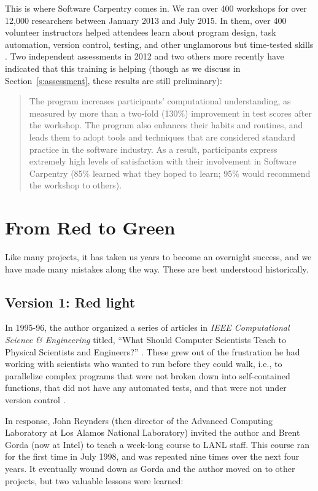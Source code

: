 \documentclass[10pt,a4paper,twocolumn]{article}
\begin{document}
This is where Software Carpentry comes in. We ran over 400 workshops
for over 12,000 researchers between January 2013 and July 2015. In
them, over 400 volunteer instructors helped attendees learn about
program design, task automation, version control, testing, and other
unglamorous but time-tested skills \cite{wilson2013}. Two independent
assessments in 2012 \cite{aranda2012,libarkin2012} and two others more
recently \cite{schossau2014,simperler2015} have indicated that this
training is helping (though as we discuss in
Section~\ref{s:assessment}, these results are still preliminary):

\begin{quote}
The program increases participants' computational understanding, as
measured by more than a two-fold (130\%) improvement in test scores
after the workshop. The program also enhances their habits and routines,
and leads them to adopt tools and techniques that are considered
standard practice in the software industry. As a result, participants
express extremely high levels of satisfaction with their involvement in
Software Carpentry (85\% learned what they hoped to learn; 95\% would
recommend the workshop to others).
\end{quote}

\section{From Red to Green}

Like many projects, it has taken us years to become an overnight
success, and we have made many mistakes along the way.  These are best
understood historically.

\subsection{Version 1: Red light}

In 1995-96, the author organized a series of articles in \emph{IEEE
Computational Science \& Engineering} titled, ``What Should Computer
Scientists Teach to Physical Scientists and Engineers?'' \cite{wilson1996}.
These grew out of the frustration he had working with scientists
who wanted to run before they could walk, i.e., to parallelize complex
programs that were not broken down into self-contained functions, that
did not have any automated tests, and that were not under version control
\cite{wilson2006a}.

In response, John Reynders (then director of the Advanced Computing
Laboratory at Los Alamos National Laboratory) invited the author and
Brent Gorda (now at Intel) to teach a week-long course to LANL staff.
This course ran for the first time in July 1998, and was repeated nine
times over the next four years. It eventually wound down as Gorda and
the author moved on to other projects, but two valuable lessons were
learned:
\end{document}
